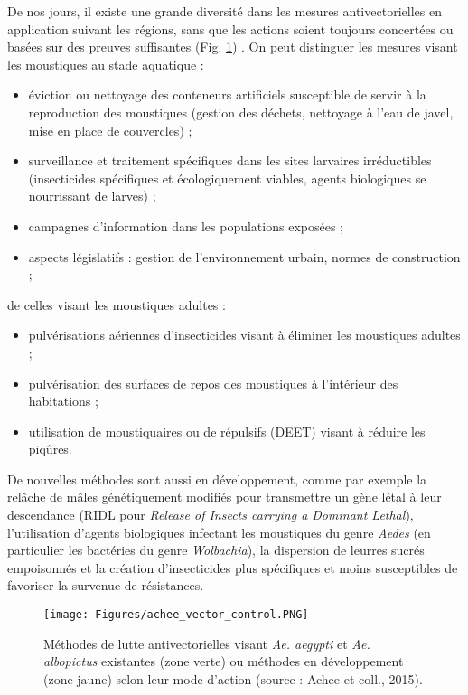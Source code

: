 De nos jours, il existe une grande diversité dans les mesures antivectorielles en application suivant les régions, sans que les actions soient toujours concertées ou basées sur des preuves suffisantes (Fig. \ref{fig:achee}) \cite{achee2015critical}.
On peut distinguer les mesures visant les moustiques au stade aquatique :
\begin{itemize}
\item éviction ou nettoyage des conteneurs artificiels susceptible de servir à la reproduction des moustiques (gestion des déchets, nettoyage à l'eau de javel, mise en place de couvercles) ;
\item surveillance et traitement spécifiques dans les sites larvaires irréductibles (insecticides spécifiques et écologiquement viables, agents biologiques se nourrissant de larves) ;
\item campagnes d'information dans les populations exposées ;
\item aspects législatifs : gestion de l'environnement urbain, normes de construction ;
\end{itemize}
de celles visant les moustiques adultes :
\begin{itemize}
\item pulvérisations aériennes d'insecticides visant à éliminer les moustiques adultes ;
\item pulvérisation des surfaces de repos des moustiques à l'intérieur des habitations ;
\item utilisation de moustiquaires ou de répulsifs (DEET) visant à réduire les piqûres.
\end{itemize}
De nouvelles méthodes sont aussi en développement, comme par exemple la relâche de mâles génétiquement modifiés pour transmettre un gène létal à leur descendance (RIDL pour {\em Release of Insects carrying a Dominant Lethal}), l'utilisation d'agents biologiques infectant les moustiques du genre {\em Aedes} (en particulier les bactéries du genre {\em Wolbachia}), la dispersion de leurres sucrés empoisonnés et la création d'insecticides plus spécifiques et moins susceptibles de favoriser la survenue de résistances.

\begin{figure}[t]
	\centering
	\texttt{[image: Figures/achee\_vector\_control.PNG]}
	\caption{Méthodes de lutte antivectorielles visant {\em Ae. aegypti} et {\em Ae. albopictus} existantes (zone verte) ou méthodes en développement (zone jaune) selon leur mode d'action (source : Achee et coll., 2015).}
	\label{fig:achee}
\end{figure}

